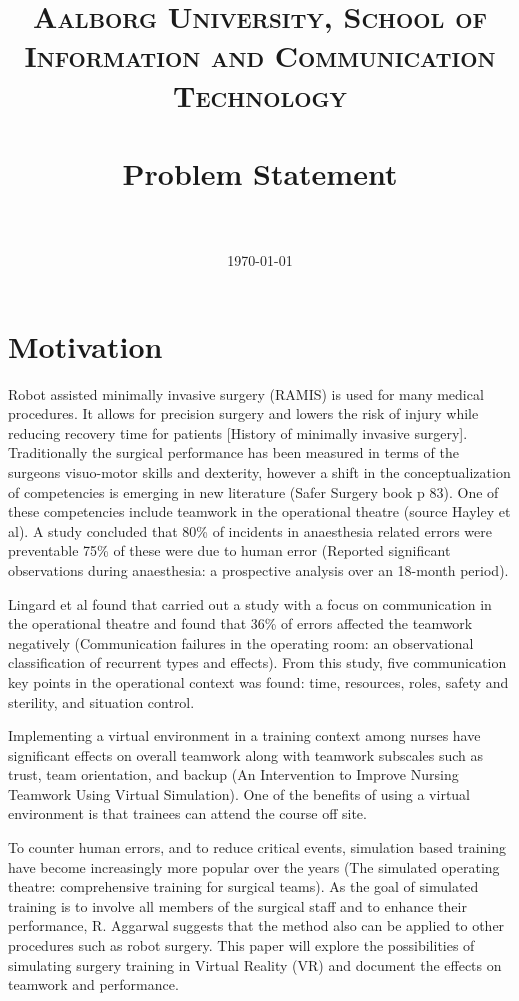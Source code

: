 \documentclass[paper=a4, fontsize=11pt]{scrartcl} %
\title{	
\normalfont \normalsize 
\textsc{Aalborg University, School of Information and Communication Technology} \\ [25pt] %
\horrule{0.5pt} \\[0.4cm] %
\huge Problem Statement \\ %
\horrule{2pt} \\[0.5cm] %
}
\date{\normalsize\today} %
\numberwithin{equation}{section} %
\numberwithin{figure}{section} %
\numberwithin{table}{section} %
\begin{document}
\maketitle %


\section{Motivation}

Robot assisted minimally invasive surgery (RAMIS) is used for many medical procedures. It allows for precision surgery and lowers the risk of injury while reducing recovery time for patients [History of minimally invasive surgery]. Traditionally the surgical performance has been measured in terms of the surgeons visuo-motor skills and dexterity, however a shift in the conceptualization of competencies is emerging in new literature (Safer Surgery book p 83). One of these competencies include teamwork in the operational theatre (source Hayley et al). A study concluded that 80\% of incidents in anaesthesia related errors were preventable 75\% of these were due to human error (Reported significant observations during anaesthesia: a prospective analysis over an 18-month period). 

Lingard et al found that carried out a study with a focus on communication in the operational theatre and found that 36\% of errors affected the teamwork negatively (Communication failures in the operating room: an observational classification of recurrent types and effects). From this study, five communication key points in the operational context was found: time, resources, roles, safety and sterility, and situation control.  

Implementing a virtual environment in a training context among nurses have significant effects on overall teamwork along with teamwork subscales such as trust, team orientation, and backup (An Intervention to Improve Nursing Teamwork Using Virtual Simulation). One of the benefits of using a virtual environment is that trainees can attend the course off site. 

To counter human errors, and to reduce critical events, simulation based training have become increasingly more popular over the years (The simulated operating theatre: comprehensive training for surgical teams). As the goal of simulated training is to involve all members of the surgical staff and to enhance their performance, R. Aggarwal suggests that the method also can be applied to other procedures such as robot surgery. 
This paper will explore the possibilities of simulating surgery training in Virtual Reality (VR) and document the effects on teamwork and performance. 
\end{document}
